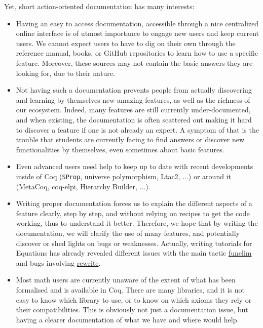 \documentclass{easychair}
\begin{document}
Yet, short action-oriented documentation has many interests:
\begin{itemize}[itemsep=0pt]
  \item Having an easy to access documentation, accessible through a nice
        centralized online interface is of utmost importance to engage new
        users and keep current users.
        We cannot expect users to have to dig on their own through the
        reference manual, books, or GitHub repositories to learn how to use a
        specific feature.
        Moreover, these sources may not contain the basic answers
        they are looking for, due to their nature.
  \item Not having such a documentation prevents people from actually
        discovering and learning by themselves new amazing features, as well as
        the richness of our ecosystem.
        Indeed, many features are still currently under-documented, and
        when existing, the documentation is often scattered out making it hard
        to discover a feature if one is not already an expert.
        A symptom of that is the trouble that students are currently facing to
        find answers or discover new functionalities by themselves, even sometimes
        about basic features.
  \item Even advanced users need help to keep up to date with recent
        developments inside of Coq (\texttt{SProp}, universe polymorphism,
        Ltac2, ...) or around it (MetaCoq, coq-elpi, Hierarchy Builder, ...).
  \item Writing proper documentation forces us to explain the different aspects
        of a feature clearly, step by step, and without relying on recipes to
        get the code working, thus to understand it better.
        Therefore, we hope that by writing the documentation, we will clarify
        the use of many features, and potentially discover or shed lights on bugs
        or weaknesses.
        Actually, writing tutorials for Equations has already revealed different
        issues with the main tactic \href{https://github.com/Zimmi48/platform-docs/pull/1}{funelim}
        and bugs involving \href{https://coq.zulipchat.com/#narrow/stream/237659-Equations-devs-.26-users/topic/Bug.20funelim.20on.20Ack}{rewrite}.
  \item Most math users are currently unaware of the extent of what has been
        formalised and is available in Coq.
        There are many libraries, and it is not easy to know which library to
        use, or to know on which axioms they rely or their compatibilities.
        This is obviously not just a documentation issue, but having a clearer
        documentation of what we have and where would help.
\end{itemize}
\end{document}
